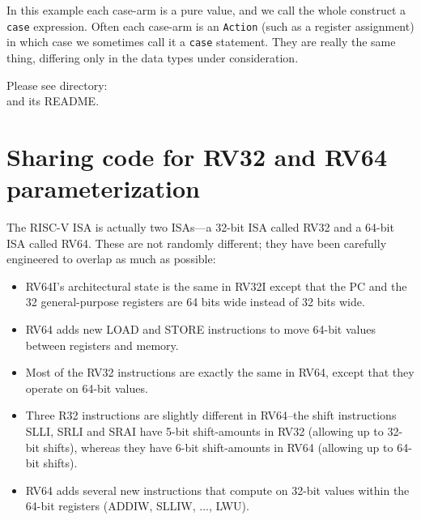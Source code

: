 \vspace{1ex}


In this example each case-arm is a pure value, and we call the whole
construct a \verb|case| expression.  Often each case-arm is an
\verb|Action| (such as a register assignment) in which case we
sometimes call it a \verb|case| statement.  They are really the same
thing, differing only in the data types under consideration.

\Beginexercise

Please see directory:  \\
and its README.
\Endexercise


\section{Sharing code for RV32 and RV64 {\via} parameterization}

\label{BSV_Paramterizing_XLEN}


The RISC-V ISA is actually two ISAs---a 32-bit ISA called RV32 and a
64-bit ISA called RV64.  These are not randomly different; they have
been carefully engineered to overlap as much as possible:

\begin{itemize}

 \item RV64I's architectural state is the same in RV32I except that
       the PC and the 32 general-purpose registers are 64 bits wide
       instead of 32 bits wide.

 \item RV64 adds new LOAD and STORE instructions to move 64-bit values
       between registers and memory.

 \item Most of the RV32 instructions are exactly the same in RV64,
       except that they operate on 64-bit values.


 \item Three R32 instructions are slightly different in RV64--the
       shift instructions SLLI, SRLI and SRAI have 5-bit shift-amounts
       in RV32 (allowing up to 32-bit shifts), whereas they have 6-bit
       shift-amounts in RV64 (allowing up to 64-bit shifts).

 \item RV64 adds several new instructions that compute on 32-bit
       values within the 64-bit registers (ADDIW, SLLIW, ..., LWU).

\end{itemize}


